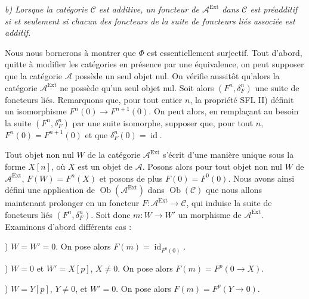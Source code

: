 \clearpage
{}%
\begingroup\small\setlength{\parskip}{0pt}\setlength{\emergencystretch}{1.5em}
\setlength{\abovedisplayskip}{4pt plus 2pt minus 2pt}%
\setlength{\belowdisplayskip}{4pt plus 2pt minus 2pt}%

\noindent\textit{b) Lorsque la catégorie $\mathcal C$ est additive, un
foncteur de $\mathcal A^{\operatorname{Ext}}$ dans $\mathcal C$ est
préadditif si et seulement si chacun des foncteurs de la suite de foncteurs
liés associée est additif.}

Nous nous bornerons à montrer que $\Phi$ est essentiellement surjectif. Tout
d'abord, quitte à modifier les catégories en présence par une équivalence,
on peut supposer que la catégorie $\mathcal A$ possède un seul objet nul.
On vérifie aussitôt qu'alors la catégorie
$\mathcal A^{\operatorname{Ext}}$ ne possède qu'un seul objet nul. Soit
alors $(F^n,\delta_F^n)$ une suite de foncteurs liés. Remarquons que, pour
tout entier $n$, la propriété SFL II) définit un isomorphisme
$F^n(0)\longrightarrow F^{n+1}(0)$. On peut alors, en remplaçant au besoin
la suite $(F^n,\delta_F^n)$ par une suite isomorphe, supposer que, pour tout
$n$, $F^n(0)=F^{n+1}(0)$ et que
$\delta_F^n(0)=\operatorname{id}$.

Tout objet non nul $W$ de la catégorie
$\mathcal A^{\operatorname{Ext}}$ s'écrit d'une manière unique sous la forme
$X[n]$, où $X$ est un objet de $\mathcal A$. Posons alors pour tout objet
non nul $W$ de $\mathcal A^{\operatorname{Ext}}$, $F(W)=F^n(X)$ et posons
de plus $F(0)=F^0(0)$. Nous avons ainsi défini une application de
$\operatorname{Ob}(\mathcal A^{\operatorname{Ext}})$ dans
$\operatorname{Ob}(\mathcal C)$ que nous allons maintenant prolonger en un
foncteur $F\colon\mathcal A^{\operatorname{Ext}}\longrightarrow\mathcal C$,
qui induise la suite de foncteurs liés $(F^n,\delta_F^n)$. Soit donc
$m\colon W\longrightarrow W'$ un morphisme de
$\mathcal A^{\operatorname{Ext}}$. Examinons d'abord différents cas :

) $W=W'=0$. On pose alors
$F(m)=\operatorname{id}_{F^0(0)}$.

) $W=0$ et $W'=X[p]$, $X\neq0$. On pose alors
$F(m)=F^p(0\longrightarrow X)$.

) $W=Y[p]$, $Y\neq0$, et $W'=0$. On pose alors
$F(m)=F^p(Y\longrightarrow0)$.

